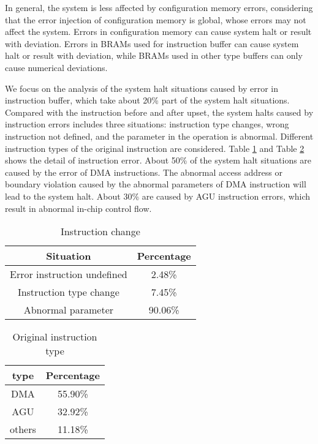 In general, the system is less affected by configuration memory errors, considering that the error injection of configuration memory is global, whose errors may not affect the system. Errors in configuration memory can cause system halt or result with deviation. Errors in BRAMs used for instruction buffer can cause system halt or result with deviation, while BRAMs used in other type buffers can only cause numerical deviations.

We focus on the analysis of the system halt situations caused by error in instruction buffer, which take about 20\% part of the system halt situations. Compared with the instruction before and after upset, the system halts caused by instruction errors includes three situations: instruction type changes, wrong instruction not defined, and the parameter in the operation is abnormal. Different instruction types of the original instruction are considered. Table \ref{tab:instruction change} and Table \ref{tab:original instruction type} shows the detail of instruction error. About 50\% of the system halt situations are caused by the error of DMA instructions. The abnormal access address or boundary violation caused by the abnormal parameters of DMA instruction will lead to the system halt. About 30\% are caused by AGU instruction errors, which result in abnormal in-chip control flow.

\begin{table}
    \centering
    \caption{Instruction change}
    \label{tab:instruction change}
    \begin{tabular}{cc}
        \toprule
            Situation & Percentage \\
        \midrule
            Error instruction undefined & 2.48\% \\
            Instruction type change & 7.45\% \\
            Abnormal parameter & 90.06\% \\
        \bottomrule
    \end{tabular}
\vspace{-1em}
\end{table}

\begin{table}
    \centering
    \caption{Original instruction type}
    \label{tab:original instruction type}
    \begin{tabular}{cc}
        \toprule
            type & Percentage \\
        \midrule
            DMA & 55.90\% \\
            AGU & 32.92\% \\
            others & 11.18\% \\
        \bottomrule
    \end{tabular}
\vspace{-1em}
\end{table}


